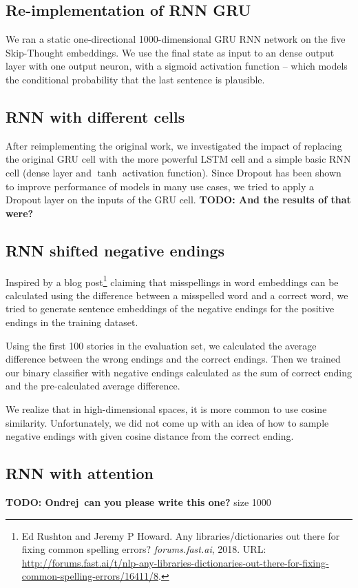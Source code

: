 \documentclass{article}
\begin{document}
\subsection{Re-implementation of RNN GRU}
We ran a static one-directional 1000-dimensional GRU RNN network on the five Skip-Thought embeddings. We use the final state as input to an dense output layer with one output neuron, with a sigmoid activation function -- which models the conditional probability that the last sentence is plausible.

\subsection{RNN with different cells}
After reimplementing the original work, we investigated the impact of replacing the original GRU cell with the more powerful LSTM cell and a simple basic RNN cell (dense layer and $\tanh$ activation function). Since Dropout \citep{Srivastava2014} has been shown to improve performance of models in many use cases, we tried to apply a Dropout layer on the inputs of the GRU cell. \textbf{TODO: And the results of that were?}

\subsection{RNN shifted negative endings}
Inspired by a blog post\footnote{Ed Rushton and Jeremy P Howard. Any libraries/dictionaries out there for fixing common spelling errors? \textit{forums.fast.ai}, 2018. URL: \url{http://forums.fast.ai/t/nlp-any-libraries-dictionaries-out-there-for-fixing-common-spelling-errors/16411/8}.} claiming that misspellings in word embeddings can be calculated using the difference between a misspelled word and a correct word, we tried to generate sentence embeddings of the negative endings for the positive endings in the training dataset. 

Using the first 100 stories in the evaluation set, we calculated the average difference between the wrong endings and the correct endings. Then we trained our binary classifier with negative endings calculated as the sum of correct ending and the pre-calculated average difference.

We realize that in high-dimensional spaces, it is more common to use cosine similarity. Unfortunately, we did not come up with an idea of how to sample negative endings with given cosine distance from the correct ending.

\subsection{RNN with attention}
\textbf{TODO: Ondrej\, can you please write this one? } size 1000
\end{document}
